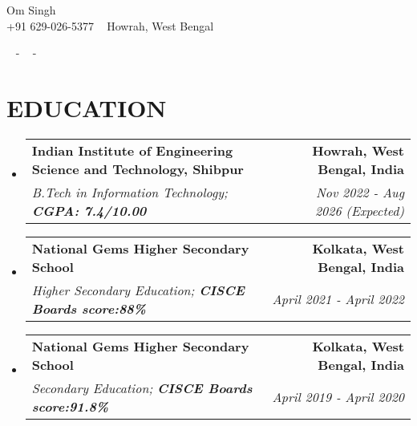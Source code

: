 \documentclass[letterpaper,11pt]{article}
\makeatletter
\newcommand{\resumeSubheading}[4]{
  \vspace{2pt}\item
    \begin{tabular*}{1.0\textwidth}[t]{l@{\extracolsep{\fill}}r}
      \textbf{\large#1} & \textbf{\small #2} \\
      \textit{\large#3} & \textit{\small #4} \\
      
    \end{tabular*}\vspace{-7pt}
}
\newcommand{\resumeSubHeadingListStart}{\begin{itemize}[leftmargin=0.0in, label={}]}
\newcommand{\resumeSubHeadingListEnd}{\end{itemize}}
\makeatother
\begin{document}


\begin{center}
    {\huge Om Singh} \\ \vspace{2pt} 
    {+91 629-026-5377} ~ 
    \small{ }
     {Howrah, West Bengal} ~ 
   
    
    \href{mailto:omupsc76@gmail.com}{\color{blue}{omupsc76@gmail.com}} ~ 
    \small{-}
    \href{www.linkedin.com/in/om-singh-110720264}{ \color{blue}{www.linkedin.com/in/om-singh}}  ~
    \small{-}
    \href{https://github.com/dEvElOpErOm11}{ \color{blue}{github.com/Om-git11}} ~
    \vspace{-7pt}
\end{center}

    


\section{\color{airforceblue}EDUCATION}
  \resumeSubHeadingListStart
    \resumeSubheading
      {Indian Institute of Engineering Science and Technology, Shibpur}{Howrah, West Bengal, India}
      {\textit{B.Tech in Information Technology;} \textbf{CGPA: 7.4/10.00}}{Nov 2022 - Aug 2026 (Expected)}
    \vspace{-4pt}
     \resumeSubheading
      {National Gems Higher Secondary School}{Kolkata, West Bengal, India}
      {\textit{Higher Secondary Education;} \textbf{CISCE Boards score:88\%}}{April 2021 - April 2022}
      \vspace{-4pt}
     \resumeSubheading
      {National Gems Higher Secondary School}{Kolkata, West Bengal, India}
      {\textit{Secondary Education;} \textbf{CISCE Boards score:91.8\%}}{April 2019 - April 2020}
  \resumeSubHeadingListEnd
  \vspace{-10pt}
\end{document}
